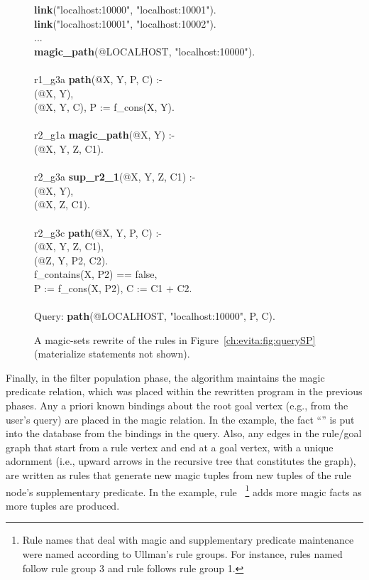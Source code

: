 {\begin{figure}[!t]
\ssp
\begin{boxedminipage}{\linewidth}
{\bf link}("localhost:10000", "localhost:10001").\\
{\bf link}("localhost:10001", "localhost:10002").\\
...\\
{\bf magic\_path}(@LOCALHOST, "localhost:10000"). \\
\\
r1\_g3a {\bf path}(@X, Y, P, C) :- \\
(@X, Y), \\
(@X, Y, C), P := f\_cons(X, Y).\\
\\
r2\_g1a {\bf magic\_path}(@X, Y) :- \\
(@X, Y, Z, C1). \\
\\
r2\_g3a {\bf sup\_r2\_1}(@X, Y, Z, C1) :- \\
(@X, Y), \\
(@X, Z, C1). \\
\\
r2\_g3c {\bf path}(@X, Y, P, C) :- \\
(@X, Y, Z, C1), \\
(@Z, Y, P2, C2). \\
\datalogspace f\_contains(X, P2) == false, \\
\datalogspace P := f\_cons(X, P2), C := C1 + C2. \\
\\
Query: {\bf path}(@LOCALHOST, "localhost:10000", P, C).
\end{boxedminipage}
\caption{\label{ch:evita:fig:magicSP}A magic-sets rewrite of
      the rules in Figure~\ref{ch:evita:fig:querySP} (materialize statements not shown).}
\end{figure}

Finally, in the filter population phase, the algorithm maintains the
magic predicate relation, which was placed within the rewritten program
in the previous phases.  Any a priori known bindings about the root goal vertex
(e.g., from the user's query) are placed in the magic relation. In the example, the 
fact ``'' is put into the
database from the bindings in the  query.  Also, any edges in
the rule/goal graph that start from a rule vertex and end at a goal vertex, with a
unique adornment (i.e., upward arrows in the recursive tree that constitutes the graph), are written as
rules that generate new magic tuples from new tuples of the rule
node's supplementary predicate. In the example, rule ~\footnote{Rule names that
deal with magic and supplementary predicate maintenance were named according
to Ullman's rule groups. For instance, rules named  follow rule group 3
and rule  follows rule group 1.}  adds
more magic facts as more  tuples are produced.

}
